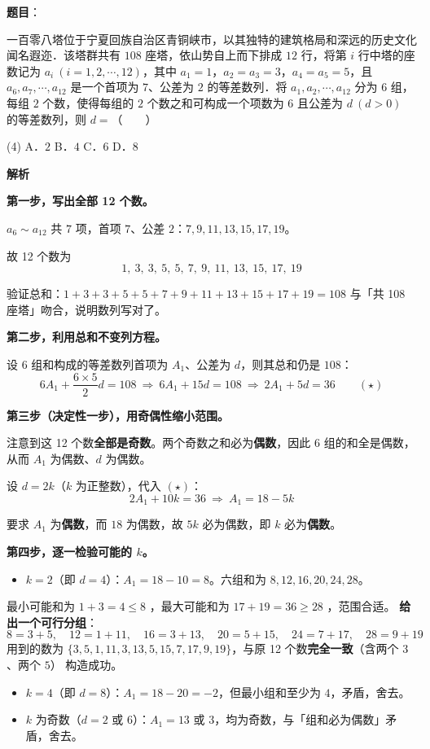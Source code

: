 \begin{answer}

\textbf{题目}：

一百零八塔位于宁夏回族自治区青铜峡市，以其独特的建筑格局和深远的历史文化闻名遐迩．该塔群共有 $108$ 座塔，依山势自上而下排成 $12$ 行，将第 $i$ 行中塔的座数记为 $a_i\ (i=1,2,\cdots,12)$，其中 $a_1=1$，$a_2=a_3=3$，$a_4=a_5=5$，且 $a_6,a_7,\cdots,a_{12}$ 是一个首项为 $7$、公差为 $2$ 的等差数列．将 $a_1,a_2,\cdots,a_{12}$ 分为 $6$ 组，每组 $2$ 个数，使得每组的 $2$ 个数之和可构成一个项数为 $6$ 且公差为 $d\ (d>0)$ 的等差数列，则 $d=$\mbox{（　　）}

\begin{gkopts}(4)
\task A．$2$
\task B．$4$
\task C．$6$
\task D．$8$
\end{gkopts}

\textbf{解析}

\textbf{第一步，写出全部 12 个数。}

$a_6\sim a_{12}$ 共 $7$ 项，首项 $7$、公差 $2$：$7,9,11,13,15,17,19$。

故 12 个数为
\nopagebreak[4]
\[1,\ 3,\ 3,\ 5,\ 5,\ 7,\ 9,\ 11,\ 13,\ 15,\ 17,\ 19\]

验证总和：$1+3+3+5+5+7+9+11+13+15+17+19=108$  与「共 108 座塔」吻合，说明数列写对了。

\textbf{第二步，利用总和不变列方程。}

设 $6$ 组和构成的等差数列首项为 $A_1$、公差为 $d$，则其总和仍是 $108$：
\nopagebreak[4]
\[6A_1+\frac{6\times5}{2}d=108\ \Longrightarrow\ 6A_1+15d=108\ \Longrightarrow\ 2A_1+5d=36\qquad(\star)\]

\textbf{第三步（决定性一步），用奇偶性缩小范围。}

注意到这 12 个数\textbf{全部是奇数}。两个奇数之和必为\textbf{偶数}，因此 $6$ 组的和全是偶数，从而 $A_1$ 为偶数、$d$ 为偶数。

设 $d=2k$（$k$ 为正整数），代入 $(\star)$：
\nopagebreak[4]
\[2A_1+10k=36\ \Longrightarrow\ A_1=18-5k\]

要求 $A_1$ 为\textbf{偶数}，而 $18$ 为偶数，故 $5k$ 必为偶数，即 $k$ 必为\textbf{偶数}。

\textbf{第四步，逐一检验可能的 $k$。}

\begin{itemize}
\item $k=2$（即 $d=4$）：$A_1=18-10=8$。六组和为 $8,12,16,20,24,28$。
\end{itemize}
  最小可能和为 $1+3=4\le 8$ ，最大可能和为 $17+19=36\ge 28$ ，范围合适。
  \textbf{给出一个可行分组}：
\nopagebreak[4]
\[8=3+5,\quad 12=1+11,\quad 16=3+13,\quad 20=5+15,\quad 24=7+17,\quad 28=9+19\]
  用到的数为 $\{3,5,1,11,3,13,5,15,7,17,9,19\}$，与原 12 个数\textbf{完全一致}（含两个 $3$、两个 $5$） 构造成功。
\begin{itemize}
\item $k=4$（即 $d=8$）：$A_1=18-20=-2$，但最小组和至少为 $4$，矛盾，舍去。
\item $k$ 为奇数（$d=2$ 或 $6$）：$A_1=13$ 或 $3$，均为奇数，与「组和必为偶数」矛盾，舍去。
\end{itemize}


\end{answer}
